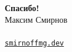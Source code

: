 \documentclass[11pt, aspectratio=169]{beamer}
\begin{document}
\begin{frame}[plain]
  \vfill
  \begin{center}
    {\Huge\textbf{Спасибо!}}\\[0.7cm]
    {\large Максим Смирнов}\\[0.5cm]
    {\hypersetup{urlcolor=black}%
     }\\[0.35cm]
    \href{https://smirnoffmg.dev}{\texttt{\large smirnoffmg.dev}}
  \end{center}
  \vfill
\end{frame}
\end{document}
